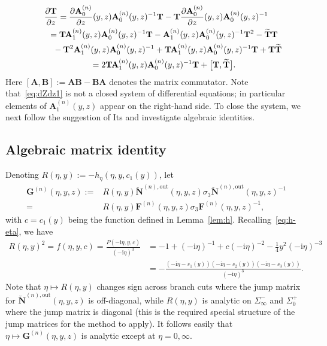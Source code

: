 \documentclass[11pt]{article}
\numberwithin{equation}{section}
\numberwithin{equation}{section}
\begin{document}
\begin{gather}
\frac{\partial\mathbf{T}}{\partial z} = \frac{\partial\mathbf{A}_0^{(n)}}{\partial z}(y,z)\mathbf{A}_0^{(n)}(y,z)^{-1}\mathbf{T}-\mathbf{T}\frac{\partial\mathbf{A}_0^{(n)}}{\partial z}(y,z)\mathbf{A}_0^{(n)}(y,z)^{-1}\nonumber\\
\hphantom{\frac{\partial\mathbf{T}}{\partial z}}{} =\mathbf{T}\mathbf{A}_1^{(n)}(y,z)\mathbf{A}_0^{(n)}(y,z)^{-1}\mathbf{T}-\mathbf{A}_1^{(n)}(y,z)\mathbf{A}_0^{(n)}(y,z)^{-1}\mathbf{T}^2-\widetilde{\mathbf{T}}\mathbf{T} \nonumber\\
\hphantom{\frac{\partial\mathbf{T}}{\partial z}=}{} -\mathbf{T}^2\mathbf{A}_1^{(n)}(y,z)\mathbf{A}_0^{(n)}(y,z)^{-1}+\mathbf{T}\mathbf{A}_1^{(n)}(y,z)\mathbf{A}_0^{(n)}(y,z)^{-1}\mathbf{T}+\mathbf{T}\widetilde{\mathbf{T}}\nonumber\\
\hphantom{\frac{\partial\mathbf{T}}{\partial z}}{} =2\mathbf{T}\mathbf{A}_1^{(n)}(y,z)\mathbf{A}_0^{(n)}(y,z)^{-1}\mathbf{T}+\big[\mathbf{T},\widetilde{\mathbf{T}}\big].\label{eq:dZdz1}
\end{gather}
Here $[\mathbf{A},\mathbf{B}]:=\mathbf{AB}-\mathbf{BA}$ denotes the matrix commutator. Note that~\eqref{eq:dZdz1} is not a closed system of differential equations; in particular elements of $\mathbf{A}_1^{(n)}(y,z)$ appear on the right-hand side. To close the system, we next follow the suggestion of Its and investigate algebraic identities.

\subsection{Algebraic matrix identity}
Denoting $R(\eta,y):=-h_\eta(\eta,y,c_1(y))$, let
\begin{align}
\mathbf{G}^{(n)}(\eta,y,z):={} & R(\eta,y)\breve{\mathbf{N}}^{(n),\mathrm{out}}(\eta,y,z)\sigma_3\breve{\mathbf{N}}^{(n),\mathrm{out}}(\eta,y,z)^{-1} \nonumber\\
 = {} & R(\eta,y)\mathbf{F}^{(n)}(\eta,y,z)\sigma_3\mathbf{F}^{(n)}(\eta,y,z)^{-1},
\label{eq:G-def}
\end{align}
with $c=c_1(y)$ being the function defined in Lemma~\ref{lem:h}. Recalling~\eqref{eq:h-eta}, we have
\begin{align*}
R(\eta,y)^2 = f(\eta,y,c)=\frac{P(-\mathrm{i}\eta,y,c)}{(-\mathrm{i}\eta)^3} &= -1+(-\mathrm{i}\eta)^{-1}+c(-\mathrm{i}\eta)^{-2}-\tfrac{1}{4}y^2(-\mathrm{i}\eta)^{-3} \\ &= -\frac{(-\mathrm{i}\eta-s_1(y))(-\mathrm{i}\eta-s_2(y))(-\mathrm{i}\eta-s_3(y))}{(-\mathrm{i}\eta)^3}.
\end{align*}
Note that $\eta\mapsto R(\eta,y)$ changes sign across branch cuts where the jump matrix for $\breve{\mathbf{N}}^{(n),\mathrm{out}}(\eta,y,z)$ is off-diagonal, while $R(\eta,y)$ is analytic on $\Sigma_\infty^-$ and $\Sigma_0^+$ where the jump matrix is diagonal (this is the required special structure of the jump matrices for the method to apply). It follows easily that $\eta\mapsto\mathbf{G}^{(n)}(\eta,y,z)$ is analytic except at $\eta=0,\infty$.
\end{document}
